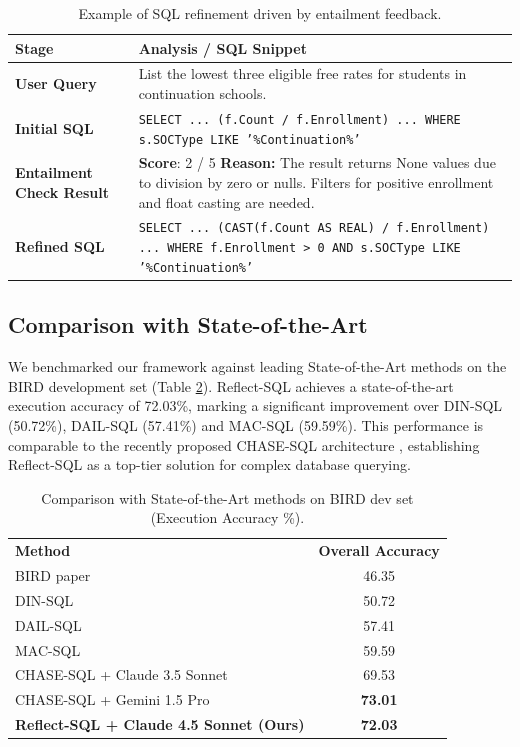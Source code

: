 \documentclass[runningheads]{llncs}
\begin{document}
\begin{table}[ht]
\caption{Example of SQL refinement driven by entailment feedback.}\label{tab:refined-sql-example}
\centering
\small
\begin{tabular}{ >{\bfseries}m{2.2cm} m{10cm} }
\toprule
\textbf{Stage} & \textbf{Analysis / SQL Snippet} \\
\midrule
User Query & List the lowest three eligible free rates for students in continuation schools. \\
\addlinespace %
Initial SQL & \texttt{SELECT ... (f.Count / f.Enrollment) ... WHERE s.SOCType LIKE '\%Continuation\%'} \\
\addlinespace
Entailment Check Result & \textbf{Score}: 2 / 5 \newline \textbf{Reason:} The result returns None values due to division by zero or nulls. Filters for positive enrollment and float casting are needed. \\
\addlinespace
Refined SQL & \texttt{SELECT ... (CAST(f.Count AS REAL) / f.Enrollment) ... WHERE f.Enrollment > 0 AND s.SOCType LIKE '\%Continuation\%'} \\
\bottomrule
\end{tabular}
\end{table}

\subsection{Comparison with State-of-the-Art}
We benchmarked our framework against leading State-of-the-Art methods on the BIRD development set (Table \ref{tab:sota-comparison}). Reflect-SQL achieves a state-of-the-art execution accuracy of 72.03\%, marking a significant improvement over DIN-SQL \cite{pourreza2023din} (50.72\%), DAIL-SQL (57.41\%) and MAC-SQL (59.59\%). This performance is comparable to the recently proposed CHASE-SQL architecture \cite{pourreza2024chase}, establishing Reflect-SQL as a top-tier solution for complex database querying.

\begin{table}[ht]
\caption{Comparison with State-of-the-Art methods on BIRD dev set (Execution Accuracy \%).}\label{tab:sota-comparison}
\centering
\begin{tabular}{lc}
\toprule
\textbf{Method} & \textbf{Overall Accuracy} \\
BIRD paper \cite{li2023bird} & 46.35 \\
DIN-SQL \cite{pourreza2023din} & 50.72 \\
DAIL-SQL \cite{gao2023text} & 57.41 \\
MAC-SQL \cite{wang2024mac} & 59.59 \\
CHASE-SQL + Claude 3.5 Sonnet \cite{pourreza2024chase} & 69.53 \\
CHASE-SQL + Gemini 1.5 Pro \cite{pourreza2024chase} & \textbf{73.01} \\
\midrule
\textbf{Reflect-SQL + Claude 4.5 Sonnet (Ours)} & \textbf{72.03} \\
\bottomrule
\end{tabular}
\end{table}
\end{document}
